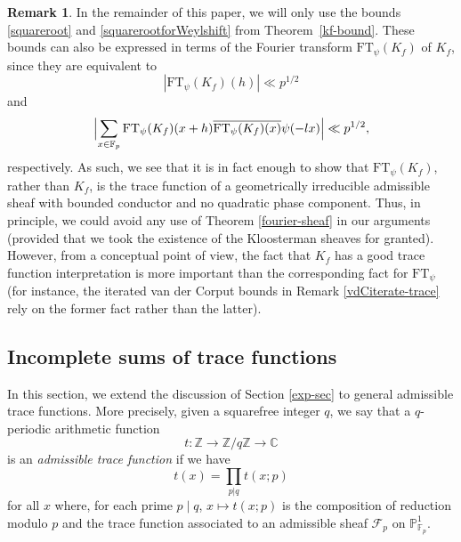 \documentclass[12pt,a4paper,reqno]{amsart}
\numberwithin{equation}{section}
\newcommand{\FT}{\mathrm{FT}}
\theoremstyle{plain}
\theoremstyle{definition}
\newtheorem{remark}[theorem]{Remark}
\newcommand\F{\mathbb{F}}
\newcommand\mcF{\mathcal{F}}
\newcommand\Pl{\mathbb{P}^1}
\newcommand\Fp{\F_{p}}
\newcommand\Zz{\mathbb{Z}}
\newcommand\Cc{\mathbb{C}}
\begin{document}
\begin{remark} In the remainder of this paper, we will only use the
  bounds \eqref{squareroot} and \eqref{squarerootforWeylshift} from
  Theorem~\ref{kf-bound}.  These bounds can also be expressed in terms
  of the Fourier transform $\FT_\psi(K_f)$ of $K_f$, since they are
  equivalent to
$$
|\FT_\psi( K_f )(h)| \ll p^{1/2}
$$
and
$$ 
\Bigl|\sum_{x \in \Fp}\FT_\psi(K_f)(x+h)\overline{\FT_\psi(K_f)(x)}
  \psi( -lx )\Bigr| \ll p^{1/2},
$$ 
respectively.  As such, we see that it is in fact enough to show that
$\FT_\psi(K_f)$, rather than $K_f$, is the trace function of a
geometrically irreducible admissible sheaf with bounded conductor and
no quadratic phase component.  Thus, in principle, we could avoid any
use of Theorem \ref{fourier-sheaf} in our arguments (provided that we took the existence of the Kloosterman sheaves for granted).  However, from a
conceptual point of view, the fact that $K_f$ has a good trace
function interpretation is more important than the corresponding fact
for $\FT_\psi$ (for instance, the iterated van der Corput bounds in
Remark \ref{vdCiterate-trace} rely on the former fact rather than the
latter).
\end{remark}


\subsection{Incomplete sums of trace
  functions}\label{compositetracefunctions}

In this section, we extend the discussion of Section \ref{exp-sec} to
general admissible trace functions. More precisely, given a
squarefree integer $q$, we say that a $q$-periodic arithmetic function 
$$
t\colon \Zz\rightarrow \Zz/q\Zz\rightarrow \Cc
$$ 
is an \emph{admissible trace function} if we have
\begin{equation}\label{tfactor}
t(x)=\prod_{p|q}t(x;p)
\end{equation}
for all $x$ where, for each prime $p\mid q$, $x\mapsto t(x;p)$ is the
composition of reduction modulo $p$ and the trace function
associated to an admissible sheaf $\mcF_{p}$ on $\Pl_{\Fp}$.
\end{document}
